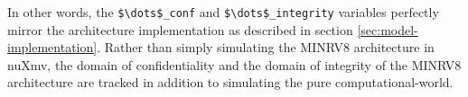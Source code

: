 In other words, the \lstinline[language=SMV,mathescape]{$\dots$_conf} and \lstinline[language=SMV,mathescape]{$\dots$_integrity} variables perfectly mirror the architecture implementation as described in section \ref{sec:model-implementation}.
Rather than simply simulating the MINRV8 architecture in nuXmv, the domain of confidentiality and the domain of integrity of the MINRV8 architecture are tracked in addition to simulating the pure computational-world.
